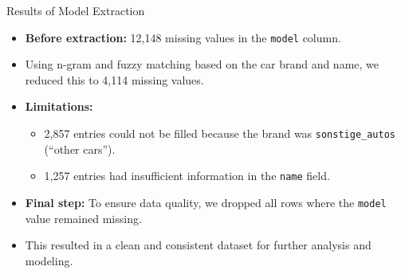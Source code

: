 \documentclass{beamer}
\begin{document}
\begin{frame}{Results of Model Extraction}
        \begin{itemize}
                \item \textbf{Before extraction:} 12,148 missing values in the
                        \texttt{model} column.
                \item Using n-gram and fuzzy matching based on the car brand
                        and name, we reduced this to 4,114 missing values.
                \item \textbf{Limitations:}
                        \begin{itemize}
                                \item 2,857 entries could not be filled because
                                        the brand was \texttt{sonstige\_autos}
                                        (“other cars”).
                                \item 1,257 entries had insufficient
                                        information in the \texttt{name} field.
                        \end{itemize}
                \item \textbf{Final step:} To ensure data quality, we dropped
                        all rows where the \texttt{model} value remained
                        missing.
                \item This resulted in a clean and consistent dataset for
                        further analysis and modeling.
        \end{itemize}
\end{frame}
\end{document}
